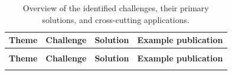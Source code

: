 \begin{longtable}{@{}
    >{\raggedright\arraybackslash}p{}
    >{\raggedright\arraybackslash}p{}
    >{\raggedright\arraybackslash}p{}
    >{\raggedright\arraybackslash}p{}
@{}}
    \caption{Overview of the identified challenges, their primary solutions, and cross-cutting applications.}
    \label{table:challenges-and-solutions-overview}\\
    \toprule
    \textbf{Theme} & \textbf{Challenge} & \textbf{Solution} & \textbf{Example publication} \\
    \midrule
    \endfirsthead

    \multicolumn{4}{@{}l}{\tablename~\thetable\ continued}\\
    \toprule
    \textbf{Theme} & \textbf{Challenge} & \textbf{Solution} & \textbf{Example publication} \\
    \midrule
    \endhead

    \bottomrule
    \endfoot


\end{longtable}
